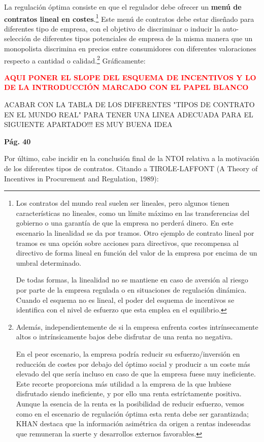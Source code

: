 \documentclass[10pt,a4paper]{article}
\begin{document}
La regulación óptima consiste en que el regulador debe ofrecer un \textbf{menú de contratos lineal en costes}.\footnote{
Los contratos del mundo real suelen ser lineales, pero algunos tienen características no lineales, como un límite máximo en las transferencias del gobierno o una garantía de que la empresa no perderá dinero. En este escenario la linealidad se da por tramos. Otro ejemplo de contrato lineal por tramos es una opción sobre acciones para directivos, que recompensa al directivo de forma lineal en función del valor de la empresa por encima de un umbral determinado.

De todas formas, la linealidad no se mantiene en caso de aversión al riesgo por parte de la empresa regulada o en situaciones de regulación dinámica. Cuando el esquema no es lineal, el poder del esquema de incentivos se identifica con el nivel de esfuerzo que esta emplea en el equilibrio.
} Este menú de contratos debe estar diseñado para diferentes tipo de empresa, con el objetivo de discriminar o inducir la auto-selección de diferentes tipos potenciales de empresa de la misma manera que un monopolista discrimina en precios entre consumidores con diferentes valoraciones respecto a cantidad o calidad.\footnote{%
    Además, independientemente de si la empresa enfrenta costes intrínsecamente altos o intrínsicamente bajos debe disfrutar de una renta no negativa. 

En el peor escenario, la empresa podría reducir su esfuerzo/inversión en reducción de costes por debajo del óptimo social y producir a un coste más elevado del que sería incluso en caso de que la empresa fuese muy ineficiente. Este recorte proporciona más utilidad a la empresa de la que hubiese disfrutado siendo ineficiente, y por ello una renta estríctamente positiva. Aunque la esencia de la renta es la posibilidad de reducir esfuerzo, vemos como en el escenario de regulación óptima esta renta debe ser garantizada; KHAN destaca que la información asimétrica da origen a rentas indeseadas que remuneran la suerte y desarrollos externos favorables.
} Gráficamente:

\textcolor{red}{\textbf{AQUI PONER EL SLOPE DEL ESQUEMA DE INCENTIVOS Y LO DE LA INTRODUCCIÓN MARCADO CON EL PAPEL BLANCO}}

ACABAR CON LA TABLA DE LOS DIFERENTES "TIPOS DE CONTRATO EN EL MUNDO REAL" PARA TENER UNA LINEA ADECUADA PARA EL SIGUIENTE APARTADO!!! ES MUY BUENA IDEA

\textbf{Pág. 40}

Por último, cabe incidir en la conclusión final de la NTOI relativa a la motivación de los diferentes tipos de contratos. Citando a TIROLE-LAFFONT (A Theory of Incentives in Procurement and Regulation, 1989):
\end{document}
